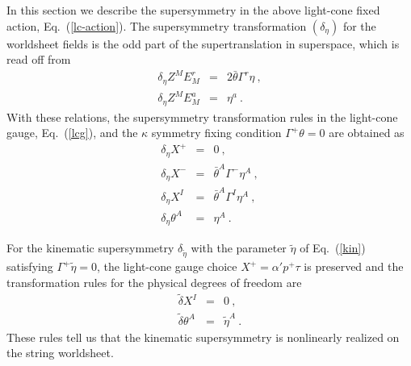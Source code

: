 \documentclass[a4paper,12pt]{article}
\begin{document}
In this section we describe the supersymmetry in the above light-cone
fixed action, Eq.~(\ref{lc-action}).  The supersymmetry
transformation $(\delta_\eta)$ for the worldsheet fields is the odd
part of the supertranslation in superspace, which is read off from
\begin{eqnarray}
\delta_\eta Z^M E_M^r &=& 2 \bar{\theta} \Gamma^r \eta~, \nonumber \\
\delta_\eta Z^M E_M^a &=& \eta^a~.
\end{eqnarray}
With these relations, the supersymmetry transformation rules in the
light-cone gauge, Eq.~(\ref{lcg}), and the $\kappa$ symmetry fixing
condition $\Gamma^+ \theta = 0$ are obtained as
\begin{eqnarray}
\delta_\eta X^+ &=& 0~, \nonumber \\
\delta_\eta X^- &=& \bar{\theta}^A \Gamma^- \eta^A~, \nonumber \\
\delta_\eta X^I &=& \bar{\theta}^A \Gamma^I \eta^A~, \nonumber \\
\delta_\eta \theta^A &=& \eta^A~.
\end{eqnarray}

For the kinematic supersymmetry $\delta_{\tilde{\eta}}$ with the
parameter $\tilde{\eta}$ of Eq.~(\ref{kin}) satisfying $\Gamma^+
\tilde{\eta} = 0$, the light-cone gauge choice $X^+ = \alpha' p^+
\tau$ is preserved and the transformation rules for the physical
degrees of freedom are
\begin{eqnarray}
\tilde{\delta} X^I &=& 0~,   \nonumber \\
\tilde{\delta} \theta^A &=& \tilde{\eta}^A~.
\end{eqnarray}
These rules tell us that the kinematic supersymmetry is nonlinearly
realized on the string worldsheet.
\end{document}
